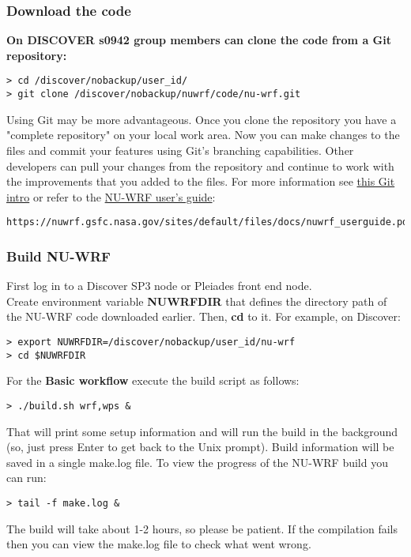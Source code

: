 \begin{frame}[fragile]\frametitle{Download the code}

\footnotesize{
\textbf{On DISCOVER {s0942 group members} can clone the code from a Git repository:}
\begin{lstlisting}
> cd /discover/nobackup/user_id/
> git clone /discover/nobackup/nuwrf/code/nu-wrf.git
\end{lstlisting}

Using Git may be more advantageous. 
Once you clone the repository you have a "complete repository" on your local work area. Now you can make
changes to the files and commit your features using Git's branching capabilities. Other developers can pull your changes from the repository and continue to work with the improvements that you added to the  files. For more information see  \href{https://nuwrf.gsfc.nasa.gov/sites/default/files/docs/git-intro.pdf}{this Git intro} or refer to the  \href{https://nuwrf.gsfc.nasa.gov/sites/default/files/docs/nuwrf_userguide.pdf}{NU-WRF user's guide}:
\begin{lstlisting}
https://nuwrf.gsfc.nasa.gov/sites/default/files/docs/nuwrf_userguide.pdf
\end{lstlisting}
}
\end{frame}


\begin{frame}[fragile]\frametitle{Build NU-WRF}

\scriptsize{
First log in to a Discover SP3 node or Pleiades front end node.\\
Create environment variable \textbf{NUWRFDIR} that defines the directory path of the NU-WRF code downloaded earlier. Then, \textbf{cd} to it. For example, on Discover:
\begin{lstlisting}
> export NUWRFDIR=/discover/nobackup/user_id/nu-wrf
> cd $NUWRFDIR
\end{lstlisting}
For the \textbf{Basic workflow} execute the build script as follows:\\
\begin{lstlisting}
> ./build.sh wrf,wps &
\end{lstlisting}
That will print some setup information and will run the build in the background (so, just press Enter to get back to the Unix prompt). Build information will be saved in a single make.log file. To view the progress of the NU-WRF build you can run:
\begin{lstlisting}
> tail -f make.log &
\end{lstlisting}
The build will take about 1-2 hours, so please be patient. If the compilation fails then you can view the make.log file to check what went wrong.
}
\end{frame}


